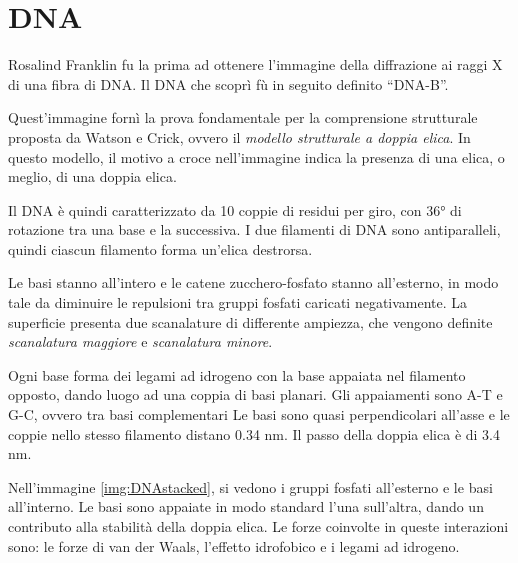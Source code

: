 \chapter{DNA}


Rosalind Franklin fu la prima ad ottenere l'immagine della diffrazione ai raggi X di una fibra di DNA. Il DNA che scoprì fù in seguito definito ``DNA-B''.

Quest'immagine fornì la prova fondamentale per la comprensione strutturale proposta da Watson e Crick, ovvero il \emph{modello strutturale a doppia elica}.
In questo modello, il motivo a croce nell'immagine indica la presenza di una elica, o meglio, di una doppia elica.

Il DNA è quindi caratterizzato da 10 coppie di residui per giro, con 36° di rotazione tra una base e la successiva.
I due filamenti di DNA sono antiparalleli, quindi ciascun filamento forma un'elica destrorsa.

Le basi stanno all'intero e le catene zucchero-fosfato stanno all'esterno, in modo tale da diminuire le repulsioni tra gruppi fosfati caricati negativamente.
La superficie presenta due scanalature di differente ampiezza, che vengono definite \emph{scanalatura maggiore} e \emph{scanalatura minore}.

Ogni base forma dei legami ad idrogeno con la base appaiata nel filamento opposto, dando luogo ad una coppia di basi planari. Gli appaiamenti sono A-T e G-C, ovvero tra basi complementari
Le basi sono quasi perpendicolari all'asse e le coppie nello stesso filamento distano 0.34 nm. Il passo della doppia elica è di 3.4 nm.



Nell'immagine \ref{img:DNAstacked}, si vedono i gruppi fosfati all'esterno e le basi all'interno. Le basi sono appaiate in modo standard l'una sull'altra, dando un contributo alla stabilità della doppia elica. Le forze coinvolte in queste interazioni sono: le forze di van der Waals, l'effetto idrofobico e i legami ad idrogeno.


